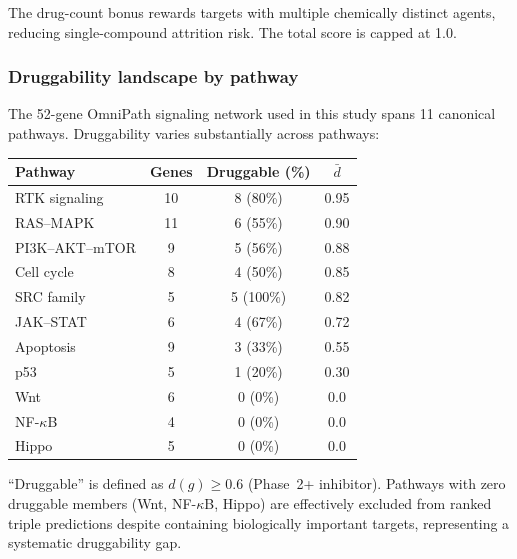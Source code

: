 \documentclass[11pt]{article}
\begin{document}
The drug-count bonus rewards targets with multiple chemically distinct agents, reducing single-compound attrition risk. The total score is capped at 1.0.

\subsubsection*{Druggability landscape by pathway}
The 52-gene OmniPath signaling network used in this study spans 11 canonical pathways. Druggability varies substantially across pathways:

\begin{center}
\small
\begin{tabular}{@{}lccc@{}}
\toprule
\textbf{Pathway} & \textbf{Genes} & \textbf{Druggable (\%)} & $\bar{d}$ \\
\midrule
RTK signaling & 10 & 8 (80\%) & 0.95 \\
RAS--MAPK & 11 & 6 (55\%) & 0.90 \\
PI3K--AKT--mTOR & 9 & 5 (56\%) & 0.88 \\
Cell cycle & 8 & 4 (50\%) & 0.85 \\
SRC family & 5 & 5 (100\%) & 0.82 \\
JAK--STAT & 6 & 4 (67\%) & 0.72 \\
Apoptosis & 9 & 3 (33\%) & 0.55 \\
p53 & 5 & 1 (20\%) & 0.30 \\
Wnt & 6 & 0 (0\%) & 0.0 \\
NF-$\kappa$B & 4 & 0 (0\%) & 0.0 \\
Hippo & 5 & 0 (0\%) & 0.0 \\
\bottomrule
\end{tabular}
\end{center}

``Druggable'' is defined as $d(g) \geq 0.6$ (Phase~2+ inhibitor). Pathways with zero druggable members (Wnt, NF-$\kappa$B, Hippo) are effectively excluded from ranked triple predictions despite containing biologically important targets, representing a systematic druggability gap.
\end{document}
